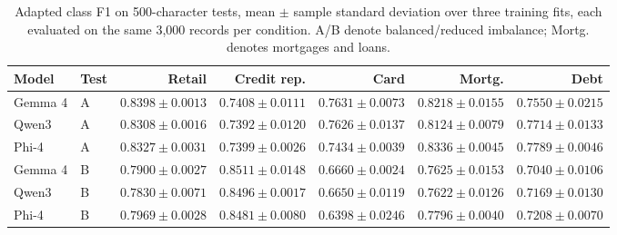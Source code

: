 \begin{table}[tb]
\centering\scriptsize
\setlength{\tabcolsep}{3pt}
\caption{Adapted class F1 on 500-character tests, mean $\pm$ sample
standard deviation over three training fits, each evaluated on the same
3,000 records per condition. A/B denote balanced/reduced imbalance;
Mortg. denotes mortgages and loans.}
\label{tab:replication_class}
\begin{tabular}{llrrrrr}\toprule
Model & Test & Retail & Credit rep. & Card & Mortg. & Debt \\\midrule
Gemma 4 & A & $0.8398\pm0.0013$ & $0.7408\pm0.0111$ & $0.7631\pm0.0073$ & $0.8218\pm0.0155$ & $0.7550\pm0.0215$ \\
Qwen3 & A & $0.8308\pm0.0016$ & $0.7392\pm0.0120$ & $0.7626\pm0.0137$ & $0.8124\pm0.0079$ & $0.7714\pm0.0133$ \\
Phi-4 & A & $0.8327\pm0.0031$ & $0.7399\pm0.0026$ & $0.7434\pm0.0039$ & $0.8336\pm0.0045$ & $0.7789\pm0.0046$ \\
Gemma 4 & B & $0.7900\pm0.0027$ & $0.8511\pm0.0148$ & $0.6660\pm0.0024$ & $0.7625\pm0.0153$ & $0.7040\pm0.0106$ \\
Qwen3 & B & $0.7830\pm0.0071$ & $0.8496\pm0.0017$ & $0.6650\pm0.0119$ & $0.7622\pm0.0126$ & $0.7169\pm0.0130$ \\
Phi-4 & B & $0.7969\pm0.0028$ & $0.8481\pm0.0080$ & $0.6398\pm0.0246$ & $0.7796\pm0.0040$ & $0.7208\pm0.0070$ \\
\bottomrule\end{tabular}\end{table}
